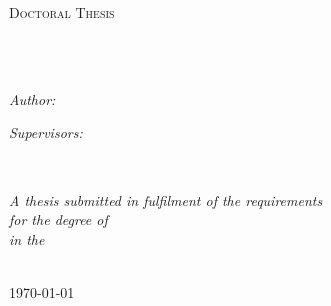 \documentclass[
11pt, %
english, %
singlespacing, %
headsepline, %
]{MastersDoctoralThesis} %
\author{Alaeddin \textsc{Nassani}} %
\begin{document}
\frontmatter %

\pagestyle{plain} %


\begin{titlepage}
\begin{center}

\vspace*{.06\textheight}
{\scshape\LARGE \univname\par}\vspace{1.5cm} %
\textsc{\Large Doctoral Thesis}\\[0.5cm] %

\HRule \\[0.4cm] %
{\huge \bfseries \ttitle\par}\vspace{0.4cm} %
\HRule \\[1.5cm] %
 
\begin{minipage}[t]{0.4\textwidth}
\begin{flushleft} \large
\emph{Author:}\\
{\authorname} %
\end{flushleft}
\end{minipage}
\begin{minipage}[t]{0.4\textwidth}
\begin{flushright} \large
\emph{Supervisors:} \\
{\supname} %
\end{flushright}
\end{minipage}\\[3cm]
 
\vfill

\large \textit{A thesis submitted in fulfilment of the requirements\\ for the degree of \degreename}\\[0.3cm] %
\textit{in the}\\[0.4cm]
\deptname\\[2cm] %
 
\vfill

{\large \today}\\[4cm] %
 
\vfill
\end{center}
\end{titlepage}
\end{document}
